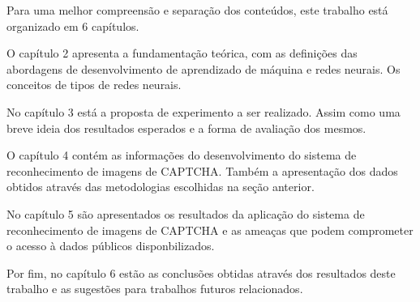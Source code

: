 Para uma melhor compreensão e separação dos conteúdos, este trabalho
está organizado em 6 capítulos.

O capítulo 2 apresenta a fundamentação teórica, com as definições das
abordagens de desenvolvimento de aprendizado de máquina e redes
neurais. Os conceitos de tipos de redes neurais.

No capítulo 3 está a proposta de experimento a ser realizado. Assim
como uma breve ideia dos resultados esperados e a forma de avaliação
dos mesmos.

O capítulo 4 contém as informações do desenvolvimento do sistema de
reconhecimento de imagens de CAPTCHA. Também a apresentação dos dados
obtidos através das metodologias escolhidas na seção anterior.

No capítulo 5 são apresentados os resultados da aplicação do sistema
de reconhecimento de imagens de CAPTCHA e as ameaças que podem
comprometer o acesso à dados públicos disponbilizados.

Por fim, no capítulo 6 estão as conclusões obtidas através dos
resultados deste trabalho e as sugestões para trabalhos futuros
relacionados.